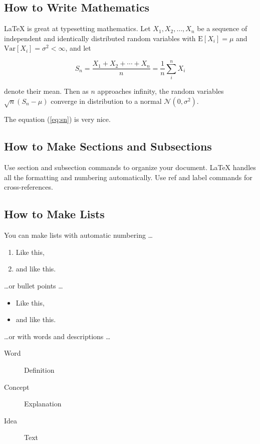 \documentclass[a4paper]{article}
\begin{document}
\subsection{How to Write Mathematics}

\LaTeX{} is great at typesetting mathematics. Let $X_1, X_2, \ldots, X_n$ be a sequence of independent and identically distributed random variables with $\text{E}[X_i] = \mu$ and $\text{Var}[X_i] = \sigma^2 < \infty$, and let

\begin{equation}
S_n = \frac{X_1 + X_2 + \cdots + X_n}{n}
      = \frac{1}{n}\sum_{i}^{n} X_i
\label{eq:sn}
\end{equation}

denote their mean. Then as $n$ approaches infinity, the random variables $\sqrt{n}(S_n - \mu)$ converge in distribution to a normal $\mathcal{N}(0, \sigma^2)$.

The equation (\ref{eq:sn}) is very nice.

\subsection{How to Make Sections and Subsections}

Use section and subsection commands to organize your document. \LaTeX{} handles all the formatting and numbering automatically. Use ref and label commands for cross-references.

\subsection{How to Make Lists}

You can make lists with automatic numbering \dots

\begin{enumerate}
\item Like this,
\item and like this.
\end{enumerate}
\dots or bullet points \dots
\begin{itemize}
\item Like this,
\item and like this.
\end{itemize}
\dots or with words and descriptions \dots
\begin{description}
\item[Word] Definition
\item[Concept] Explanation
\item[Idea] Text
\end{description}
\end{document}
